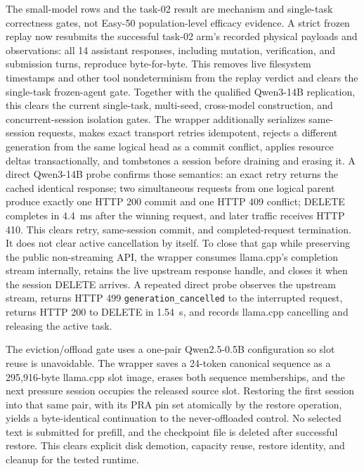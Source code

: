 \documentclass[11pt]{article}
\begin{document}
The small-model rows and the task-02 result are mechanism and single-task
correctness gates, not Easy-50 population-level efficacy evidence.  A strict
frozen replay now resubmits the successful task-02 arm's recorded physical
payloads and observations: all 14 assistant responses, including mutation,
verification, and submission turns, reproduce byte-for-byte.  This removes
live filesystem timestamps and other tool nondeterminism from the replay
verdict and clears the single-task frozen-agent gate.  Together with the
qualified Qwen3-14B replication, this clears the current single-task,
multi-seed, cross-model construction, and concurrent-session isolation gates.
The wrapper additionally serializes same-session requests, makes exact
transport retries idempotent, rejects a different generation from the same
logical head as a commit conflict, applies resource deltas transactionally,
and tombstones a session before draining and erasing it.  A direct Qwen3-14B
probe confirms those semantics: an exact retry returns the cached identical
response; two simultaneous requests from one logical parent produce exactly one
HTTP 200 commit and one HTTP 409 conflict; DELETE completes in 4.4~ms after the
winning request, and later traffic receives HTTP 410.  This clears retry,
same-session commit, and completed-request termination.  It does not clear
active cancellation by itself.  To close that gap while preserving the public
non-streaming API, the wrapper consumes llama.cpp's completion stream
internally, retains the live upstream response handle, and closes it when the
session DELETE arrives.  A repeated direct probe observes the upstream stream,
returns HTTP 499 \texttt{generation\_cancelled} to the interrupted request,
returns HTTP 200 to DELETE in 1.54~s, and records llama.cpp cancelling and
releasing the active task.

The eviction/offload gate uses a one-pair Qwen2.5-0.5B configuration so slot
reuse is unavoidable.  The wrapper saves a 24-token canonical sequence as a
295,916-byte llama.cpp slot image, erases both sequence memberships, and the
next pressure session occupies the released source slot.  Restoring the first
session into that same pair, with its PRA pin set atomically by the restore
operation, yields a byte-identical continuation to the never-offloaded control.
No selected text is submitted for prefill, and the checkpoint file is deleted
after successful restore.  This clears explicit disk demotion, capacity reuse,
restore identity, and cleanup for the tested runtime.
\end{document}

